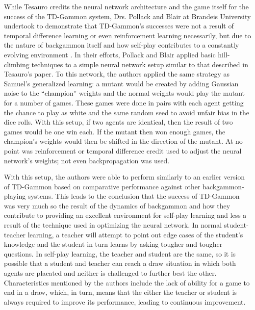 While Tesauro credits the neural network architecture and the game itself for
the success of the TD-Gammon system,
Drs. Pollack and Blair at Brandeis University undertook to demonstrate that
TD-Gammon's successes were not a result of
temporal difference learning
or even reinforcement learning necessarily,
but due to the nature of backgammon itself and how self-play contributes to a
constantly evolving environment
\cite{why-td-gammon}.
%
In their efforts,
Pollack and Blair applied basic hill-climbing techniques to a simple neural
network setup similar to that described in Tesauro's paper.
%
To this network,
the authors applied the same strategy as Samuel's generalized learning:
a mutant would be created by adding Gaussian noise to the ``champion'' weights
and the normal weights would play the mutant for a number of games.
%
These games were done in pairs with each agent getting the chance to play as
white and the same random seed to avoid unfair bias in the dice rolls.
%
With this setup,
if two agents are identical,
then the result of two games would be one win each.
%
If the mutant then won enough games,
the champion's weights would then be shifted in the direction of the mutant.
%
At no point was reinforcement or temporal difference credit used to adjust the
neural network's weights;
not even backpropagation was used.

With this setup,
the authors were able to perform similarly to an earlier version of TD-Gammon
based on comparative performance against other backgammon-playing systems.
%
This leads to the conclusion that the success of TD-Gammon was very much so
the result of the dynamics of backgammon and how they contribute to providing an
excellent environment for self-play learning
and less a result of the technique used in optimizing the neural network.
%
In normal student-teacher learning,
a teacher will attempt to point out edge cases of the student's knowledge
and the student in turn learns by asking tougher and tougher questions.
%
In self-play learning,
the teacher and student are the same,
so it is possible that a student and teacher can reach a draw situation in which
both agents are placated and neither is challenged to further best the other.
%
Characteristics mentioned by the authors include the lack of ability for a game
to end in a draw, which, in turn, means that the either the teacher or student is
always required to improve its performance,
leading to continuous improvement.

